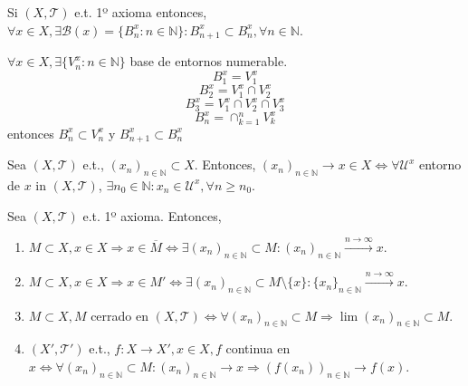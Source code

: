\begin{obs}
  Si $( X, \mathcal{T} )$ e.t. 1º axioma entonces, $\forall x \in X, \exists \mathcal{B}(x) = \{  B_{n}^{x} : n \in \mathbb{N} \} :  B_{n+1}^{x} \subset B_{n}^{x}, \forall n \in \mathbb{N}$. \\
\end{obs}

\begin{dem}
  
  $\forall x \in X, \exists \{  V_{n}^{x} : n \in \mathbb{N} \}$ base de entornos numerable. 
  \[ 
    B_{1}^{x} = V_{1}^{x}
  \] 
  \[ 
    B_{2}^{x} = V_{1}^{x} \cap V_{2}^{x}
  \] 
  \[ 
    B_{3}^{x} = V_{1}^{x} \cap V_{2}^{x} \cap V_{3}^{x}
  \] 
  \[ 
    B_{n}^{x} = \cap_{k=1}^{n} V_{k}^{x} 
  \] 
  entonces $B_{n}^{x} \subset V_{n}^{x}$ y $B_{n+1}^{x} \subset B_{n}^{x}$

\end{dem}

\begin{defn}
  Sea $( X, \mathcal{T} )$ e.t., $( x_{n} )_{n \in \mathbb{N}} \subset X$. Entonces, $( x_{n} )_{n \in \mathbb{N}} \rightarrow x \in X \Leftrightarrow \forall \mathcal{U}^{x}$ entorno de $x$ in $( X, \mathcal{T} )$, $\exists n_{0} \in \mathbb{N} : x_{n} \in \mathcal{U}^{x}, \forall n \geq n_{0}$.
\end{defn}

\begin{prop}
  Sea $( X, \mathcal{T} )$ e.t. 1º axioma. Entonces,
  \begin{enumerate}[label=(\roman*)]
    \item $M \subset X, x \in X \Rightarrow x \in \overline{M} \Leftrightarrow \exists ( x_{n} )_{n \in \mathbb{N}} \subset M : ( x_{n} )_{n \in \mathbb{N}} \xrightarrow[]{ n \rightarrow \infty } x$.
    \item $M \subset X, x \in X \Rightarrow x \in M' \Leftrightarrow \exists ( x_{n} )_{n \in \mathbb{N}} \subset M \setminus \{  x \}: \{ x_{n} \}_{n \in \mathbb{N}} \xrightarrow[]{ n \rightarrow \infty } x$.
    \item $M \subset X, M$ cerrado en $( X, \mathcal{T} ) \Leftrightarrow \forall ( x_{n} )_{n \in \mathbb{N}} \subset M \Rightarrow \lim ( x_{n} )_{n \in \mathbb{N}} \subset M$.
    \item $( X', \mathcal{T}' )$ e.t., $f : X \to X', x \in X, f$ continua en $x \Leftrightarrow \forall ( x_{n} )_{n \in \mathbb{N}} \subset M : ( x_{n} )_{n \in \mathbb{N}} \rightarrow x \Rightarrow ( f(x_{n}) )_{n \in \mathbb{N}} \rightarrow f(x)$.
  \end{enumerate}
\end{prop}

